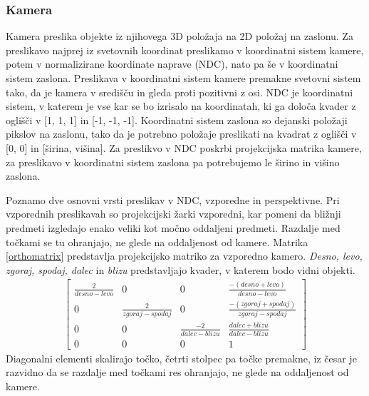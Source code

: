 \documentclass[a4paper, 12pt]{book}
\begin{document}
\subsubsection*{Kamera}

Kamera preslika objekte iz njihovega 3D položaja na 2D položaj na zaslonu. Za preslikavo najprej iz svetovnih koordinat preslikamo v koordinatni sistem kamere, potem v normalizirane koordinate naprave (NDC), nato pa še v koordinatni sistem zaslona. Preslikava v koordinatni sistem kamere premakne svetovni sistem tako, da je kamera v središču in gleda proti pozitivni z osi. NDC je koordinatni sistem, v katerem je vse kar se bo izrisalo na koordinatah, ki ga določa kvader z oglišči v [1, 1, 1] in [-1, -1, -1]. Koordinatni sistem zaslona so dejanski položaji pikslov na zaslonu, tako da je potrebno položaje preslikati na kvadrat z oglišči v [0, 0] in [širina, višina]. Za preslikvo v NDC poskrbi projekcijska matrika kamere, za preslikavo v koordinatni sistem zaslona pa potrebujemo le širino in višino zaslona.

Poznamo dve osnovni vrsti preslikav v NDC, vzporedne in perspektivne. Pri vzporednih preslikavah so projekcijski žarki vzporedni, kar pomeni da bližnji predmeti izgledajo enako veliki kot močno oddaljeni predmeti. Razdalje med točkami se tu ohranjajo, ne glede na oddaljenost od kamere. Matrika \ref{orthomatrix} predstavlja projekcijsko matriko za vzporedno kamero. \emph{Desno, levo, zgoraj, spodaj, dalec} in \emph{blizu} predstavljajo kvader, v katerem bodo vidni objekti.
\begin{align}
\begin{bmatrix}
\frac{2}{desno-levo} & 0 & 0 & \frac{-(desno+levo)}{desno-levo}\\ 
0 & \frac{2}{zgoraj-spodaj} & 0 & \frac{-(zgoraj+spodaj)}{zgoraj-spodaj} \\ 
0 & 0 & \frac{-2}{dalec-blizu} & \frac{dalec+blizu}{dalec-blizu} \\ 
0 & 0 & 0 & 1
\end{bmatrix}
\label{orthomatrix}
\end{align}
Diagonalni elementi skalirajo točko, četrti stolpec pa točke premakne, iz česar je razvidno da se razdalje med točkami res ohranjajo, ne glede na oddaljenost od kamere.
\end{document}
